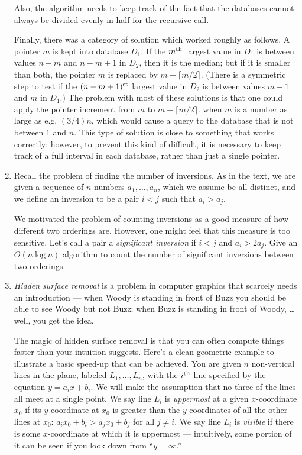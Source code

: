 \documentclass[12pt]{article}
\begin{document}
\begin{enumerate}
{Also, the algorithm needs to keep track of the fact that
the databases cannot always be divided evenly in half
for the recursive call.

Finally, there was a category of solution which worked
roughly as follows.  A pointer $m$ is kept into database $D_1$.
If the $m^{\rm th}$ largest value in $D_1$ is between values
$n-m$ and $n-m+1$ in $D_2$, then it is the median;
but if it is smaller than both, the pointer $m$ is replaced by 
$m + \lceil m/2 \rceil$.
(There is a symmetric step to test if the $(n-m+1)^{\rm st}$
largest value in $D_2$ is between values $m-1$ and $m$ in $D_1$.)
The problem with most of these solutions is that one could
apply the pointer increment from $m$ to $m + \lceil m/2 \rceil$.
when $m$ is a number as large as e.g. $(3/4)n$, which would 
cause a query to the database that is not between $1$ and $n$.
This type of solution is close to something that works correctly;
however, to prevent this kind of difficult,
it is necessary to keep track of a full interval in
each database, rather than just a single pointer.

}


\item 

Recall the problem of finding the number of inversions. As in the
text, we are given a sequence of $n$ numbers $a_1, \ldots, a_n$, which
we assume be all distinct, and we define an 
inversion to be a pair $i<j$ such that $a_i > a_j$. 

We motivated the problem of 
counting inversions as a good measure of how different two orderings are. 
However, one might feel that this measure is
too sensitive. Let's call a pair a {\em significant inversion} if
$i <j$ and  $a_i > 2 a_j$. Give an $O(n\log n)$ algorithm to count
the number of significant inversions between two orderings.



\item\Star
{\em Hidden surface removal} is a problem
in computer graphics that scarcely needs an introduction ---
when Woody is standing in front of Buzz you should be
able to see Woody but not Buzz;
when Buzz is standing in front of Woody, \ldots well, you get the idea.

The magic of hidden surface removal is that you can often
compute things faster than your intuition suggests.
Here's a clean geometric example to illustrate a basic speed-up
that can be achieved.
You are given $n$ non-vertical lines in the plane, labeled $L_1, \ldots, L_n$,
with the $i^{\rm th}$ line specified by the equation
$y = a_i x + b_i$.
We will make the assumption that no three of the lines
all meet at a single point.
We say line $L_i$ is {\em uppermost} at a given $x$-coordinate $x_0$ if
its $y$-coordinate at $x_0$ is greater than the $y$-coordinates
of all the other lines at $x_0$:
$a_i x_0 + b_i > a_j x_0 + b_j$ for all $j \neq i$.
We say line $L_i$ is {\em visible} if there is some $x$-coordinate
at which it is uppermost ---
intuitively, some portion
of it can be seen if you look down from ``$y = \infty$.''


\end{enumerate}
\end{document}
